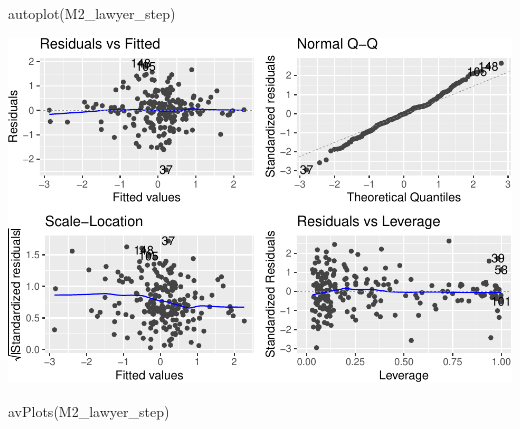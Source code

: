 \documentclass[
]{article}
\newenvironment{Shaded}{\begin{snugshade}}{\end{snugshade}}
\newcommand{\FunctionTok}[1]{\textcolor[rgb]{0.00,0.00,0.00}{#1}}
\newcommand{\NormalTok}[1]{#1}
\begin{document}
\begin{Shaded}
\begin{Highlighting}[]
\FunctionTok{autoplot}\NormalTok{(M2\_lawyer\_step)}
\end{Highlighting}
\end{Shaded}

\includegraphics{HW5-Trinath-Sai-Subhash-Reddy-Pittala_files/figure-latex/unnamed-chunk-22-1.pdf}

\begin{Shaded}
\begin{Highlighting}[]
\FunctionTok{avPlots}\NormalTok{(M2\_lawyer\_step)}
\end{Highlighting}
\end{Shaded}
\end{document}
